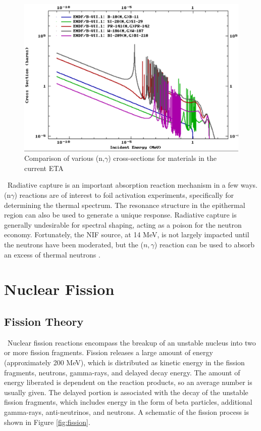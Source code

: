 \begin{figure}[ht]
	\includegraphics[width=\linewidth]{Figures/Chapter2/ngamma.png}
	\caption[Comparison of various (n,$\gamma$) cross-sections for materials in the current ETA]{Comparison of various (n,$\gamma$) cross-sections\cite{ENDF} for materials in the current ETA}
	\label{fig:ngamma}	
\end{figure}

\ Radiative capture is an important absorption reaction mechanism in a few ways. 
(n$\gamma$) reactions are of interest to foil activation experiments, specifically for determining the thermal spectrum. 
The resonance structure in the epithermal region can also be used to generate a unique response. 
Radiative capture is generally undesirable for spectral shaping, acting as a poison for the neutron economy. 
Fortunately, the NIF source, at 14 MeV, is not largely impacted until the neutrons have been moderated, but the ($n,\gamma$) reaction can be used to absorb an excess of thermal neutrons \cite{Bevins}. 

\section{Nuclear Fission}
\subsection{Fission Theory}
\ Nuclear fission reactions encompass the breakup of an unstable nucleus into two or more fission fragments. 
Fission releases a large amount of energy (approximately 200 MeV), which is distributed as kinetic energy in the fission fragments, neutrons, gamma-rays, and delayed decay energy. 
The amount of energy liberated is dependent on the reaction products, so an average number is usually given.
The delayed portion is associated with the decay of the unstable fission fragments, which includes energy in the form of beta particles, additional gamma-rays, anti-neutrinos, and neutrons. 
A schematic of the fission process is shown in Figure \ref{fig:fission}.



